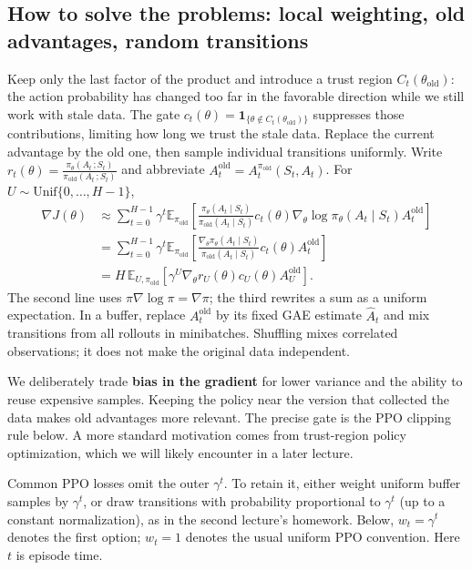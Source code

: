 \documentclass[11pt,a4paper]{article}
\newcommand{\E}{\mathbb{E}}
\newcommand{\old}{\mathrm{old}}
\newcommand{\Ahat}{\widehat A}
\begin{document}
\subsection{How to solve the problems: local weighting, old advantages, random transitions}
Keep only the last factor of the product and introduce a trust region
$C_t(\theta_\old)$: the action probability has changed too far in the favorable
direction while we still work with stale data. The gate $c_t(\theta)=\mathbf{1}_{\{\theta\notin C_t(\theta_\old)\}}$
suppresses those contributions, limiting how long we trust the stale data. Replace the current advantage by the old one, then sample
individual transitions uniformly. Write
$r_t(\theta)=\tfrac{\pi_\theta(A_t\,; S_t)}{\pi_\old(A_t\,; S_t)}$ and abbreviate
$A_t^\old=A_t^{\pi_\old}(S_t,A_t)$. For $U\sim\mathrm{Unif}\{0,\ldots,H-1\}$,
\begin{align*}
 \nabla J(\theta)
 &\approx\sum_{t=0}^{H-1}\gamma^t\E_{\pi_\old}\!\left[
 \frac{\pi_\theta(A_t\mid S_t)}{\pi_\old(A_t\mid S_t)}c_t(\theta)
 \nabla_\theta\log\pi_\theta(A_t\mid S_t)A_t^\old\right]\\
 &=\sum_{t=0}^{H-1}\gamma^t\E_{\pi_\old}\!\left[
 \frac{\nabla_\theta\pi_\theta(A_t\mid S_t)}{\pi_\old(A_t\mid S_t)}
 c_t(\theta)A_t^\old\right]\\
 &=H\,\E_{U,\pi_\old}\!\left[
 \gamma^U\nabla_\theta r_U(\theta)c_U(\theta)A_U^\old\right].
\end{align*}
The second line uses $\pi\nabla\log\pi=\nabla\pi$; the third rewrites a sum as a
uniform expectation. In a buffer, replace $A_t^\old$ by its fixed GAE estimate
$\Ahat_t$ and mix transitions from all rollouts in minibatches. Shuffling mixes
correlated observations; it does not make the original data independent.

We deliberately trade \textbf{bias in the gradient} for lower variance and the
ability to reuse expensive samples. Keeping the policy near the version that
collected the data makes old advantages more relevant. The precise gate is the
PPO clipping rule below. A more standard motivation comes from trust-region
policy optimization, which we will likely encounter in a later lecture.

Common PPO losses omit the outer $\gamma^t$. To retain
it, either weight uniform buffer samples by $\gamma^t$, or draw transitions with
probability proportional to $\gamma^t$ (up to a constant normalization), as in
the second lecture's homework. Below, $w_t=\gamma^t$ denotes the first option;
$w_t=1$ denotes the usual uniform PPO convention. Here $t$ is episode time.
\end{document}
